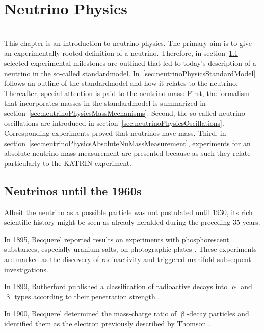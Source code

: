 \def\currentRootFolder{chapter/neutrinoPhysics}
\def\currentFigureFolder{\currentRootFolder/fig}

\chapter{Neutrino Physics}
\label{sec:neutrinoPhysics}
\\
This chapter is an introduction to neutrino physics. The primary aim is to give an experimentally-rooted definition of a neutrino. Therefore, in section~\ref{sec:neutrinoPhysicsHistory} selected experimental milestones are outlined that led to today's description of a neutrino in the so-called \gls{standardmodel}. In~\ref{sec:neutrinoPhysicsStandardModel} follows an outline of the \gls{standardmodel} and how it relates to the neutrino. Thereafter, special attention is paid to the neutrino mass: First, the formalism that incorporates masses in the \gls{standardmodel} is summarized in section~\ref{sec:neutrinoPhysicsMassMechanisms}. Second, the so-called neutrino oscillations are introduced in section~\ref{sec:neutrinoPhysicsOscillations}. Corresponding experiments proved that neutrinos have mass.  Third, in section~\ref{sec:neutrinoPhysicsAbsoluteNuMassMeasurement}, experiments for an absolute neutrino mass measurement are presented because as such they relate particularly to the KATRIN experiment.

\section{Neutrinos until the 1960s}
\label{sec:neutrinoPhysicsHistory}
Albeit the neutrino as a possible particle was not postulated until 1930, its rich scientific history might be seen as already heralded during the preceding 35 years. 

In 1895, Becquerel reported results on experiments with phosphorescent substances, especially uranium salts, on photographic plates \cite{Becquerel:1}. These experiments are marked as the discovery of radioactivity and triggered manifold subsequent investigations. 

In 1899, Rutherford published a classification of radioactive decays into $\upalpha$ and $\upbeta$ types according to their penetration strength \cite{Rutherford:1}. 

In 1900, Becquerel determined the mass-charge ratio of $\upbeta$-decay particles and identified them as the electron previously described by Thomson \cite{Becquerel:2} \cite{Thomson:1}. 

